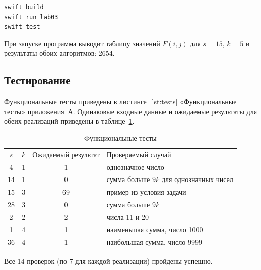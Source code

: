 \bigskip
\noindent\begin{minipage}{\dimexpr\linewidth-0.5mm\relax}
\begin{lstlisting}[caption={Команды сборки, запуска и тестирования},label={lst:run}]
swift build
swift run lab03
swift test
\end{lstlisting}
\end{minipage}
\medskip

При запуске программа выводит таблицу значений $F(i,j)$ для $s=15$, $k=5$
и результаты обоих алгоритмов: 2654.

\subsection{Тестирование}

Функциональные тесты приведены в листинге~\ref{lst:tests}
«Функциональные тесты» приложения~А. Одинаковые входные данные и ожидаемые
результаты для обеих реализаций приведены в таблице~\ref{tbl:tests}.

\begin{table}[H]
\caption{Функциональные тесты}
\label{tbl:tests}
\setlength{\extrarowheight}{2pt}
\begin{tabularx}{\linewidth}{|c|c|c|X|}
\hline
$s$ & $k$ & Ожидаемый результат & Проверяемый случай \\
\hhline{|=:=:=:=|}
4 & 1 & 1 & однозначное число \\ \hline
14 & 1 & 0 & сумма больше $9k$ для однозначных чисел \\ \hline
15 & 3 & 69 & пример из условия задачи \\ \hline
28 & 3 & 0 & сумма больше $9k$ \\ \hline
2 & 2 & 2 & числа 11 и 20 \\ \hline
1 & 4 & 1 & наименьшая сумма, число 1000 \\ \hline
36 & 4 & 1 & наибольшая сумма, число 9999 \\ \hline
\end{tabularx}
\end{table}

Все 14 проверок (по 7 для каждой реализации) пройдены успешно.
